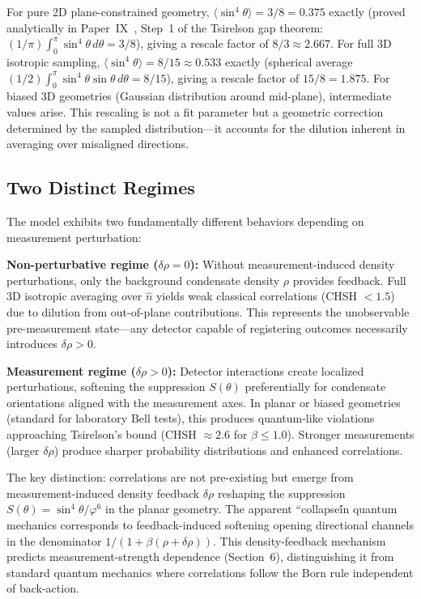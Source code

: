 \documentclass[11pt,a4paper]{article}
\theoremstyle{definition}
\theoremstyle{remark}
\newcommand{\vp}{\varphi}
\begin{document}
For pure 2D plane-constrained geometry, $\langle \sin^4\theta \rangle = 3/8 = 0.375$ exactly
(proved analytically in Paper~IX~\cite{Paper9}, Step~1 of the Tsirelson gap theorem:
$(1/\pi)\int_0^\pi\sin^4\theta\,d\theta = 3/8$), giving a rescale factor of $8/3\approx2.667$.
For full 3D isotropic sampling,
$\langle \sin^4\theta \rangle = 8/15 \approx 0.533$ exactly
(spherical average $(1/2)\int_0^\pi\sin^4\theta\sin\theta\,d\theta = 8/15$),
giving a rescale factor of $15/8 = 1.875$.
For biased 3D geometries (Gaussian distribution around mid-plane), intermediate values arise.
This rescaling is not a fit parameter but a geometric correction determined by the sampled
distribution---it accounts for the dilution inherent in averaging over misaligned directions.

\subsection{Two Distinct Regimes}

The model exhibits two fundamentally different behaviors depending on measurement perturbation:

\textbf{Non-perturbative regime ($\delta\rho = 0$):} Without measurement-induced density perturbations, only the background condensate density $\rho$ provides feedback. Full 3D isotropic averaging over $\hat{n}$ yields weak classical correlations (CHSH $< 1.5$) due to dilution from out-of-plane contributions. This represents the unobservable pre-measurement state---any detector capable of registering outcomes necessarily introduces $\delta\rho > 0$.

\textbf{Measurement regime ($\delta\rho > 0$):} Detector interactions create localized perturbations, softening the suppression $S(\theta)$ preferentially for condensate orientations aligned with the measurement axes. In planar or biased geometries (standard for laboratory Bell tests), this produces quantum-like violations approaching Tsirelson's bound (CHSH $\approx 2.6$ for $\beta \leq 1.0$). Stronger measurements (larger $\delta\rho$) produce sharper probability distributions and enhanced correlations.

The key distinction: correlations are not pre-existing but emerge from measurement-induced density feedback $\delta\rho$ reshaping the suppression $S(\theta)=\sin^4\!\theta/\vp^6$ in the planar geometry. The apparent ``collapse\'\' in quantum mechanics corresponds to feedback-induced softening opening directional channels in the denominator $1/(1+\beta(\rho+\delta\rho))$. This density-feedback mechanism predicts measurement-strength dependence (Section~6), distinguishing it from standard quantum mechanics where correlations follow the Born rule independent of back-action.
\end{document}
